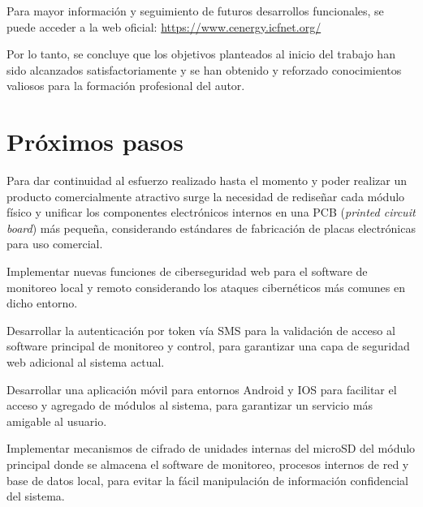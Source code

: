 Para mayor información y seguimiento de futuros desarrollos funcionales, se puede acceder a la web oficial: \url{https://www.cenergy.icfnet.org/}

Por lo tanto, se concluye que los objetivos planteados al inicio del trabajo han sido alcanzados satisfactoriamente y se han obtenido y reforzado conocimientos valiosos para la formación profesional del autor.


\section{Próximos pasos}

Para dar continuidad al esfuerzo realizado hasta el momento y poder realizar un producto comercialmente atractivo surge la necesidad de rediseñar cada módulo físico y unificar los componentes electrónicos internos en una PCB (\emph{printed circuit board}) más pequeña, considerando estándares de fabricación de placas electrónicas para uso comercial.

Implementar nuevas funciones de ciberseguridad web para el software de monitoreo local y remoto considerando los ataques cibernéticos más comunes en dicho entorno.

Desarrollar la autenticación por token vía SMS para la validación de acceso al software principal de monitoreo y control, para garantizar una capa de seguridad web adicional al sistema actual.

Desarrollar una aplicación móvil para entornos Android y IOS para facilitar el acceso y agregado de módulos al sistema, para garantizar un servicio más amigable al usuario.

Implementar mecanismos de cifrado de unidades internas del microSD del módulo principal donde se almacena el software de monitoreo, procesos internos de red y base de datos local, para evitar la fácil manipulación de información confidencial del sistema.

